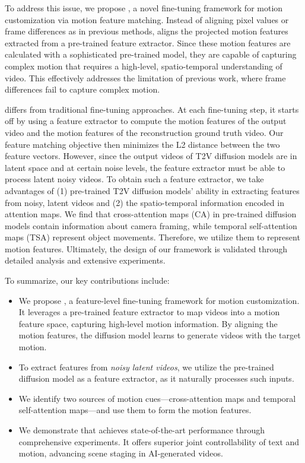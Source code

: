 To address this issue, we propose {\ours}, a novel fine-tuning framework for motion customization via motion feature matching. Instead of aligning pixel values or frame differences as in previous methods, {\ours} aligns the projected motion features extracted from a pre-trained feature extractor. Since these motion features are calculated with a sophisticated pre-trained model, they are capable of capturing complex motion that requires a high-level, spatio-temporal understanding of video. This effectively addresses the limitation of previous work, where frame differences fail to capture complex motion.

{\ours} differs from traditional fine-tuning approaches. At each fine-tuning step, it starts off by using a feature extractor to compute the motion features of the output video and the motion features of the reconstruction ground truth video. Our feature matching objective then minimizes the L2 distance between the two feature vectors. However, since the output videos of T2V diffusion models are in latent space and at certain noise levels, the feature extractor must be able to process latent noisy videos. To obtain such a feature extractor, we take advantages of (1) pre-trained T2V diffusion models' ability in extracting features from noisy, latent videos and (2) the spatio-temporal information encoded in attention maps. We find that cross-attention maps (CA) in pre-trained diffusion models contain information about camera framing, while temporal self-attention maps (TSA) represent object movements. Therefore, we utilize them to represent motion features. Ultimately, the design of our framework is validated through detailed analysis and extensive experiments.

To summarize, our key contributions include:
\begin{itemize}
  \item We propose {\bf\ours}, a feature-level fine-tuning framework for motion customization. It leverages a pre-trained feature extractor to map videos into a motion feature space, capturing high-level motion information. By aligning the motion features, the diffusion model learns to generate videos with the target motion.
  \item To extract features from \emph{noisy latent videos}, we utilize the pre-trained diffusion model as a feature extractor, as it naturally processes such inputs.
  \item We identify two sources of motion cues---cross-attention maps and temporal self-attention maps---and use them to form the motion features.
  \item We demonstrate that {\ours} achieves state-of-the-art performance through comprehensive experiments. It offers superior joint controllability of text and motion, advancing scene staging in AI-generated videos.
\end{itemize}